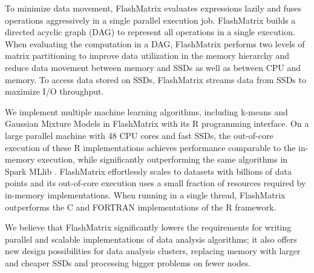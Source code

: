 To minimize data movement, FlashMatrix evaluates expressions lazily and fuses
operations aggressively in a single parallel execution job.
FlashMatrix builds a directed acyclic graph (DAG) to represent all operations
in a single execution. When evaluating the computation in a DAG, FlashMatrix
performs two levels of matrix partitioning to improve data utilization in
the memory hierarchy and reduce data movement between memory and SSDs
as well as between CPU and memory. To access data stored on SSDs, FlashMatrix
streams data from SSDs to maximize I/O throughput.  






We implement multiple machine learning algorithms, including k-means \cite{kmeans}
and Gaussian Mixture Models \cite{gmm} in FlashMatrix with its R programming
interface. On a large parallel machine with 48
CPU cores and fast SSDs, the out-of-core execution of these R implementations
achieves performance comparable to the in-memory execution,
while significantly outperforming the same algorithms in Spark MLlib
\cite{spark}. FlashMatrix effortlessly scales to datasets with billions
of data points and its out-of-core execution uses a small fraction of
resources required by in-memory implementations. 
When running in a single thread, FlashMatrix 
outperforms the C and FORTRAN implementations of the R framework.

We believe that FlashMatrix significantly lowers the requirements for writing parallel
and scalable implementations of data analysis algorithms; it also offers new
design possibilities for data analysis clusters, replacing memory with larger
and cheaper SSDs and processing bigger problems on fewer nodes.
